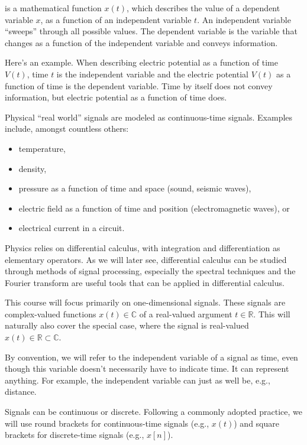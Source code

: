  is a mathematical function $x(t)$, which describes the value of a  dependent variable $x$, as a function of an independent variable $t$. An independent variable ``sweeps'' through all possible values. The dependent variable is the variable that changes as a function of the independent variable and conveys information.

Here's an example. When describing electric potential as a function of time $V(t)$, time $t$ is the independent variable and the electric potential $V(t)$ as a function of time is the dependent variable. Time by itself does not convey information, but electric potential as a function of time does.

Physical ``real world'' signals are modeled as continuous-time signals. Examples include, amongst countless others:
\begin{itemize}
 \setlength\itemsep{0.25em}        
\item temperature,
\item density,
\item pressure as a function of time and space (sound, seismic waves),
\item electric field as a function of time and position
  (electromagnetic waves), or
\item electrical current in a circuit.
\end{itemize}
Physics relies on differential calculus, with integration and differentiation as elementary operators. As we will later see, differential calculus can be studied through methods of signal processing, especially the spectral techniques and the Fourier transform are useful tools that can be applied in differential calculus.

This course will focus primarily on one-dimensional signals. These signals are complex-valued functions $x(t) \in \mathbb{C}$ of a real-valued argument $t\in \mathbb{R}$. This will naturally also cover the
special case, where the signal is real-valued
$x(t) \in \mathbb{R} \subset\mathbb{C}$. 

By convention, we will refer to the independent variable of a signal as time, even though this variable doesn't necessarily have to indicate time. It can represent anything. For example, the independent variable can just as well be, e.g., distance.

Signals can be continuous or discrete. Following a commonly adopted practice, we will use round brackets for continuous-time signals (e.g., $x(t)$) and square brackets for discrete-time signals (e.g., $x[n]$). 

